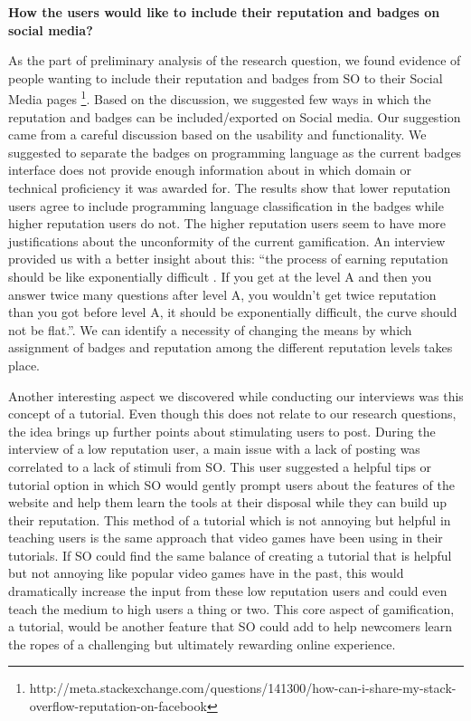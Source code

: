 \documentclass{sigchi}
\begin{document}
\textbf{How the users would like to include their reputation and badges on social media?}

As the part of preliminary analysis of the research question, we found evidence of people wanting to include their reputation and badges from SO to their Social Media pages \footnote{http://meta.stackexchange.com/questions/141300/how-can-i-share-my-stack-overflow-reputation-on-facebook}. Based on the discussion, we suggested few ways in which the reputation and badges can be included/exported on Social media. Our suggestion came from a careful discussion based on the usability and functionality. We suggested to separate the badges on programming language as the current badges interface does not provide enough information about in which domain or technical proficiency it was awarded for. The results show that lower reputation users agree to include programming language classification in the badges while higher reputation users do not. The higher reputation users seem to have more justifications about the unconformity of the current gamification. An interview provided us with  a better insight about this: “the process of earning reputation should be like exponentially difficult . If you get at the level A and then you answer twice many questions after level A, you wouldn’t get twice reputation than you got before level A, it should be exponentially difficult, the curve should not be flat.”. We can identify a necessity of changing the means by which assignment of  badges and reputation among the different reputation levels takes place.


Another interesting aspect we discovered while conducting our interviews was this concept of a tutorial. Even though this does not relate to our research questions, the idea brings up further points about stimulating users to post. During the interview of a low reputation user, a main issue with a lack of posting was correlated to a lack of stimuli from SO. This user suggested a helpful tips or tutorial option in which SO would gently prompt users about the features of the website and help them learn the tools at their disposal while they can build up their reputation. This method of a tutorial which is not annoying but helpful in teaching users is the same approach that video games have been using in their tutorials. If SO could find the same balance of creating a tutorial that is helpful but not annoying like popular video games have in the past, this would dramatically increase the input from these low reputation users and could even teach the medium to high users a thing or two. This core aspect of gamification, a tutorial, would be another feature that SO could add to help newcomers learn the ropes of a challenging but ultimately rewarding online experience.
\end{document}
